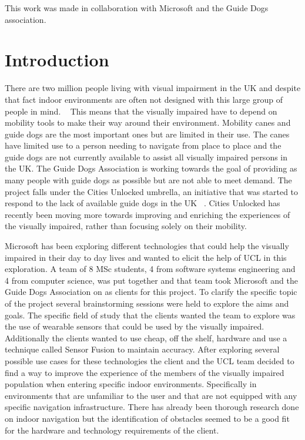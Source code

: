 \documentclass[prodmode,acmtosem]{acmsmall} %
\begin{document}


\begin{bottomstuff}
This work was made in collaboration with Microsoft and the Guide Dogs association.
\end{bottomstuff}

\maketitle

\section{Introduction}
There are two million people living with visual impairment in the UK and despite that fact indoor environments are often not designed with this large group of people in mind. ~\cite{NHSBlindStatistics} This means that the visually impaired have to depend on mobility tools to make their way around their environment. Mobility canes and guide dogs are the most important ones but are limited in their use. The canes have limited use to a person needing to navigate from place to place and the guide dogs are not currently available to assist all visually impaired persons in the UK. The Guide Dogs Association is working towards the goal of providing as many people with guide dogs as possible but are not able to meet demand. The project falls under the Cities Unlocked umbrella, an initiative that was started to respond to the lack of available guide dogs in the UK ~\cite{CitiesUnlockedGeneral}. Cities Unlocked has recently been moving more towards improving and enriching the experiences of the visually impaired, rather than focusing solely on their mobility.

Microsoft has been exploring different technologies that could help the visually impaired in their day to day lives and wanted to elicit the help of UCL in this exploration. A team of 8 MSc students, 4 from software systems engineering and 4 from computer science, was put together and that team took Microsoft and the Guide Dogs Association on as clients for this project. To clarify the specific topic of the project several brainstorming sessions were held to explore the aims and goals. The specific field of study that the clients wanted the team to explore was the use of wearable sensors that could be used by the visually impaired. Additionally the clients wanted to use cheap, off the shelf, hardware and use a technique called Sensor Fusion to maintain accuracy.
After exploring several possible use cases for these technologies the client and the UCL team decided to find a way to improve the experience of the members of the visually impaired population when entering specific indoor environments.
Specifically in environments that are unfamiliar to the user and that are not equipped with any specific navigation infrastructure. There has already been thorough research done on indoor navigation but the identification of obstacles seemed to be a good fit for the hardware and technology requirements of the client.
\end{document}
